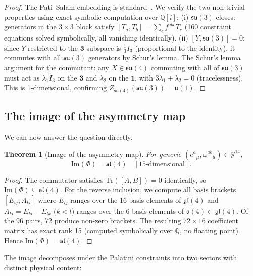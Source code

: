 \documentclass[11pt,a4paper]{article}
\theoremstyle{plain}
\newtheorem{theorem}{Theorem}[section]
\theoremstyle{definition}
\theoremstyle{remark}
\begin{document}
\begin{proof}
The Pati--Salam embedding is standard~\cite{PatiSalam1974}.  We verify the two 
non-trivial properties using exact symbolic computation over $\mathbb{Q}[i]$:
(i) $\mathfrak{su}(3)$ closes: generators in the $3\times 3$ block satisfy 
$[T_a, T_b] = \sum_c f^{abc} T_c$ (160 constraint equations solved symbolically,
all vanishing identically).
(ii) $[Y, \mathfrak{su}(3)] = 0$: since $Y$ restricted to the $\mathbf{3}$ subspace is 
$\tfrac{1}{3}I_3$ (proportional to the identity), it commutes with all $\mathfrak{su}(3)$ 
generators by Schur's lemma.
The Schur's lemma argument for the commutant: any $X \in \mathfrak{su}(4)$ commuting 
with all of $\mathfrak{su}(3)$ must act as $\lambda_1 I_3$ on the $\mathbf{3}$ and 
$\lambda_2$ on the $\mathbf{1}$, with $3\lambda_1 + \lambda_2 = 0$ (tracelessness).  
This is 1-dimensional, confirming $Z_{\mathfrak{su}(4)}(\mathfrak{su}(3)) = \mathfrak{u}(1)$.
\end{proof}

\subsection{The image of the asymmetry map}

We can now answer the question directly.

\begin{theorem}[Image of the asymmetry map]\label{thm:image-phi}
For generic $(e^a{}_\mu, \omega^{ab}{}_\mu) \in \mathcal{Y}^{14}$,
\begin{equation}
  \mathrm{Im}(\Phi) = \mathfrak{sl}(4) \quad [\text{15-dimensional}].
\end{equation}
\end{theorem}

\begin{proof}
The commutator satisfies $\mathrm{Tr}([A,B]) = 0$ identically, so 
$\mathrm{Im}(\Phi) \subseteq \mathfrak{sl}(4)$.
For the reverse inclusion, we compute all basis brackets $[E_{ij}, A_{kl}]$ where $E_{ij}$ ranges over the 16
basis elements of $\mathfrak{gl}(4)$ and $A_{kl}=E_{kl}-E_{lk}$ ($k<l$) ranges over the 6 basis
elements of $\mathfrak{o}(4)\subset\mathfrak{gl}(4)$. Of the 96 pairs, 72 produce non-zero brackets.
The resulting $72\times 16$ coefficient matrix has exact rank 15 (computed symbolically over $\mathbb{Q}$, no floating point).
Hence $\mathrm{Im}(\Phi) = \mathfrak{sl}(4)$.
\end{proof}

The image decomposes under the Palatini constraints into two sectors with distinct physical content:
\end{document}
